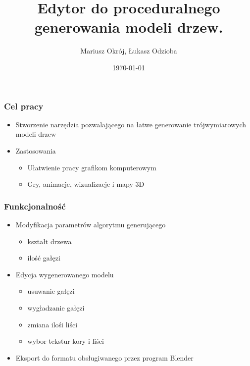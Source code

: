 \documentclass[blue,table]{beamer}
\begin{document}
\title{Edytor do proceduralnego generowania modeli drzew.}
\author{Mariusz Okrój, Łukasz Odzioba}
\date{\today} 

\begin{frame}
\titlepage
\end{frame}


\begin{frame}\frametitle{Cel pracy}
\begin{itemize}
\item{Stworzenie narzędzia pozwalającego na łatwe generowanie trójwymiarowych modeli drzew}
\item{Zastosowania}
\begin{itemize}
\item{Ułatwienie pracy grafikom komputerowym}
\item{Gry, animacje, wizualizacje i mapy 3D}
\end{itemize}
\end{itemize}
\end{frame}


\begin{frame}\frametitle{Funkcjonalność}
\begin{itemize}
\item{Modyfikacja parametrów algorytmu generującego}
\begin{itemize}
\item{kształt drzewa}
\item{ilość gałęzi}
\end{itemize}
\item{Edycja wygenerowanego modelu}
\begin{itemize}
\item{usuwanie gałęzi}
\item{wygładzanie gałęzi}
\item{zmiana ilośi liści}
\item{wybor tekstur kory i liści}
\end{itemize}
\item{Eksport do formatu obsługiwanego przez program Blender}
\end{itemize}
\end{frame}
\end{document}
